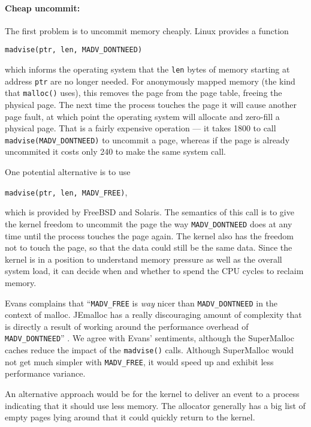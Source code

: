 \documentclass[pldi]{sigplanconf-pldi15}
\newcommand{\code}[1]{\texttt{#1}}
\newcommand{\ns}[1]{\unit{#1}\nano\second{}}
\begin{document}
{\paragraph{Cheap uncommit:}} The first problem is to uncommit memory
cheaply.  Linux provides a function
\begin{center}
\code{madvise(ptr, len, MADV_DONTNEED)}
\end{center}
which informs the operating system that the \code{len} bytes of memory
starting at address \code{ptr} are no longer needed.  For anonymously
mapped memory (the kind that \code{malloc()} uses), this removes the
page from the page table, freeing the physical page.  The next time
the process touches the page it will cause another page fault, at
which point the operating system will allocate and zero-fill a
physical page.  That is a fairly expensive operation --- it takes
\ns{1800} to call \code{madvise(MADV_DONTNEED)} to uncommit a page,
whereas if the page is already uncommited it costs only \ns{240} to
make the same system call.

One potential alternative is to use
\begin{center}
\code{madvise(ptr, len, MADV_FREE)},
\end{center}
which is provided by FreeBSD and Solaris.  The semantics of this call
is to give the kernel freedom to uncommit the page the way
\code{MADV_DONTNEED} does at any time until the process touches the
page again.  The kernel also has the freedom not to touch the page, so
that the data could still be the same data.  Since the kernel is in a
position to understand memory pressure as well as the overall system
load, it can decide when and whether to spend the CPU cycles to
reclaim memory.

Evans complains that ``\code{MADV_FREE} is \textit{way} nicer than
\code{MADV_DONTNEED} in the context of malloc.  JEmalloc has a really
discouraging amount of complexity that is directly a result of working
around the performance overhead of \code{MADV_DONTNEED}''
\cite{Evans12}.  We agree with Evans' sentiments, although the
SuperMalloc caches reduce the impact of the \code{madvise()} calls.
Although SuperMalloc would not get much simpler with \code{MADV_FREE},
it would speed up and exhibit less performance variance.

An alternative approach would be for the kernel to deliver an event to
a process indicating that it should use less memory.  The allocator
generally has a big list of empty pages lying around that it could
quickly return to the kernel.
\end{document}
